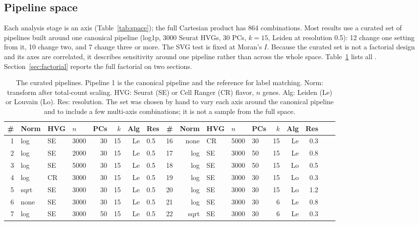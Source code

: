 \documentclass[conference]{IEEEtran}
\begin{document}
\subsection{Pipeline space}
Each analysis stage is an axis (Table~\ref{tab:space}); the full Cartesian
product has 864 combinations. Most results use a curated set of \Nspecs{}
pipelines built around one canonical pipeline (log1p, 3000 Seurat HVGs, 30
PCs, $k=15$, Leiden at resolution 0.5): 12 change one setting from it, 10
change two, and 7 change three or more. The SVG test is fixed at Moran's
$I$. Because the curated set is not a factorial design and its axes are
correlated, it describes sensitivity around one pipeline rather than across
the whole space. Table~\ref{tab:curated} lists all \Nspecs{}. Section~\ref{sec:factorial}
reports the full factorial on two sections.
\begin{table}[t]
  \centering
  \caption{The \Nspecs{} curated pipelines. Pipeline 1 is the canonical
  pipeline and the reference for label matching. Norm: transform after
  total-count scaling. HVG: Seurat (SE) or Cell Ranger (CR) flavor, $n$
  genes. Alg: Leiden (Le) or Louvain (Lo). Res: resolution. The set was
  chosen by hand to vary each axis around the canonical pipeline and to
  include a few multi-axis combinations; it is not a sample from the full
  space.}
  \label{tab:curated}
  \footnotesize
  \setlength{\tabcolsep}{3.5pt}
  \begin{tabular}{@{}rlllrrrlr@{\hspace{14pt}}rlllrrrlr@{}}
    \toprule
    \# & Norm & HVG & $n$ & PCs & $k$ & Alg & Res & \# & Norm & HVG & $n$ & PCs & $k$ & Alg & Res \\
    \midrule
    1 & log & SE & 3000 & 30 & 15 & Le & 0.5 & 16 & none & CR & 5000 & 30 & 15 & Le & 0.3 \\
    2 & log & SE & 2000 & 30 & 15 & Le & 0.5 & 17 & log & SE & 3000 & 50 & 15 & Le & 0.8 \\
    3 & log & SE & 5000 & 30 & 15 & Le & 0.5 & 18 & log & SE & 3000 & 50 & 15 & Lo & 0.5 \\
    4 & log & CR & 3000 & 30 & 15 & Le & 0.5 & 19 & log & SE & 3000 & 30 & 15 & Lo & 0.3 \\
    5 & sqrt & SE & 3000 & 30 & 15 & Le & 0.5 & 20 & log & SE & 3000 & 30 & 15 & Lo & 1.2 \\
    6 & none & SE & 3000 & 30 & 15 & Le & 0.5 & 21 & log & SE & 3000 & 30 & 6 & Le & 0.8 \\
    7 & log & SE & 3000 & 50 & 15 & Le & 0.5 & 22 & sqrt & SE & 3000 & 30 & 6 & Le & 0.3 \\

\end{tabular}
\end{table}
\end{document}

